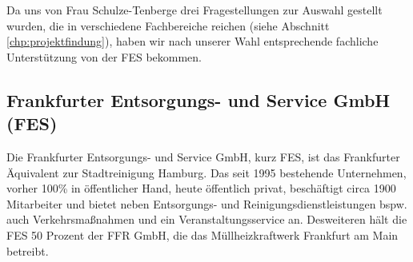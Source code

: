         Da uns von Frau Schulze-Tenberge drei Fragestellungen zur Auswahl gestellt wurden, die in verschiedene Fachbereiche reichen (siehe Abschnitt\,\ref{chp:projektfindung}), haben wir nach unserer Wahl entsprechende fachliche Unterstützung von der FES bekommen.


    \subsection{Frankfurter Entsorgungs- und Service GmbH (FES)}

        Die Frankfurter Entsorgungs- und Service GmbH, kurz FES, ist das Frankfurter Äquivalent zur Stadtreinigung Hamburg. 
        Das seit 1995 bestehende Unternehmen, vorher 100\% in öffentlicher Hand, heute öffentlich privat, beschäftigt circa 1900 Mitarbeiter und bietet neben Entsorgungs- und Reinigungsdienstleistungen bspw. auch Verkehrsmaßnahmen und ein Veranstaltungsservice an.
        Desweiteren hält die FES 50 Prozent der FFR GmbH, die das Müllheizkraftwerk Frankfurt am Main betreibt.
